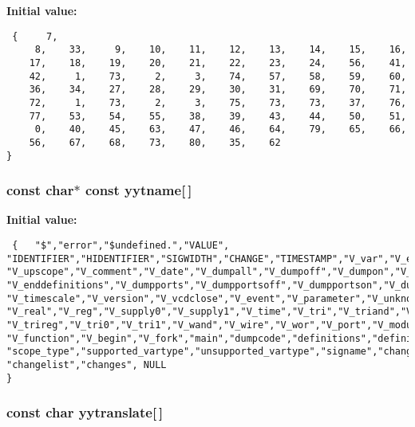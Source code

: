 {\bf Initial value:}

\footnotesize\begin{verbatim} {     7,
     8,    33,     9,    10,    11,    12,    13,    14,    15,    16,
    17,    18,    19,    20,    21,    22,    23,    24,    56,    41,
    42,     1,    73,     2,     3,    74,    57,    58,    59,    60,
    36,    34,    27,    28,    29,    30,    31,    69,    70,    71,
    72,     1,    73,     2,     3,    75,    73,    73,    37,    76,
    77,    53,    54,    55,    38,    39,    43,    44,    50,    51,
     0,    40,    45,    63,    47,    46,    64,    79,    65,    66,
    56,    67,    68,    73,    80,    35,    62
}\end{verbatim}\normalsize 
{}
\subsubsection{\setlength{\rightskip}{0pt plus 5cm}const char$\ast$ const yytname[$\,$]\hspace{0.3cm}{\tt  [static]}}\label{vcd__parser_8c_a88}


{\bf Initial value:}

\footnotesize\begin{verbatim} {   "$","error","$undefined.","VALUE",
"IDENTIFIER","HIDENTIFIER","SIGWIDTH","CHANGE","TIMESTAMP","V_var","V_end","V_scope",
"V_upscope","V_comment","V_date","V_dumpall","V_dumpoff","V_dumpon","V_dumpvars",
"V_enddefinitions","V_dumpports","V_dumpportsoff","V_dumpportson","V_dumpportsall",
"V_timescale","V_version","V_vcdclose","V_event","V_parameter","V_unknown","V_integer",
"V_real","V_reg","V_supply0","V_supply1","V_time","V_tri","V_triand","V_trior",
"V_trireg","V_tri0","V_tri1","V_wand","V_wire","V_wor","V_port","V_module","V_task",
"V_function","V_begin","V_fork","main","dumpcode","definitions","definition",
"scope_type","supported_vartype","unsupported_vartype","signame","changelists",
"changelist","changes", NULL
}\end{verbatim}\normalsize 
{}
\subsubsection{\setlength{\rightskip}{0pt plus 5cm}const char yytranslate[$\,$]\hspace{0.3cm}{\tt  [static]}}\label{vcd__parser_8c_a84}



